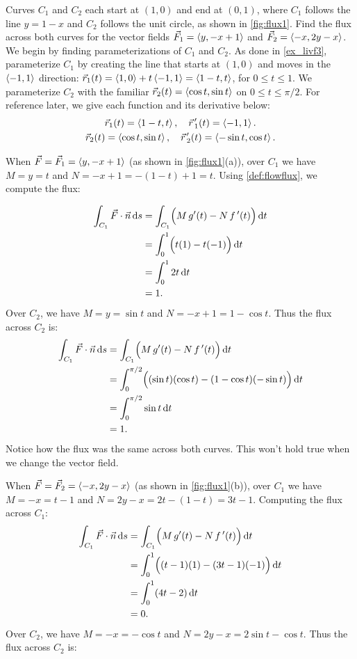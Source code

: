 \begin{example}\label{ex_flux1}%
Curves $C_1$ and $C_2$ each start at $(1,0)$ and end at $(0,1)$, where $C_1$ follows the line $y=1-x$ and $C_2$ follows the unit circle, as shown in \autoref{fig:flux1}. Find the flux across both curves for the vector fields $\vec F_1 =\left\langle y,-x+1\right\rangle$ and $\vec F_2 =\left\langle -x,2y-x\right\rangle$.
\solution
We begin by finding parameterizations of $C_1$ and $C_2$. As done in \autoref{ex_livf3}, parameterize $C_1$ by creating the line that starts at $(1,0)$ and moves in the $\left\langle -1,1\right\rangle$ direction: $\vec r_1(t) =\left\langle 1,0\right\rangle+t\left\langle -1,1\right\rangle=\left\langle 1-t,t\right\rangle$, for $0\leq t\leq 1$. We parameterize $C_2$ with the familiar $\vec r_2(t) =\left\langle \cos t,\sin t\right\rangle$ on $0\leq t\leq \pi/2$. For reference later, we give each function and its derivative below:
\begin{gather*}
\vec r_1(t) =\left\langle 1-t,t\right\rangle,\quad\vec r\hskip1.25pt '_1(t)=\left\langle -1,1\right\rangle.\\
\vec r_2(t) =\left\langle \cos t,\sin t\right\rangle, \quad \vec r\hskip1.25pt '_2(t) =\left\langle -\sin t,\cos t\right\rangle.
\end{gather*}

When $\vec F = \vec F_1 =\left\langle y,-x+1\right\rangle$ (as shown in \autoref{fig:flux1}(a)), over $C_1$ we have $M = y =t$ and $N = -x+1 = -(1-t)+1 = t$. Using \autoref{def:flowflux}, we compute the flux:

\begin{align*}
\int_{C_1} \vec F\cdot \vec n\operatorname{d}\! s & = \int_{C_1} \Bigl(M\,g'(t) - N\,f\,'(t)\Bigr)\operatorname{d}\! t\\
			&= \int_0^1 \Bigl( t(1) - t(-1)\Bigr)\operatorname{d}\! t \\
			&= \int_0^1 2t\operatorname{d}\! t\\
			&= 1.
\end{align*}
Over $C_2$, we have $M = y = \sin t$ and $N = -x+1 = 1-\cos t$. Thus the flux across $C_2$ is:
\begin{align*}
	\int_{C_1} \vec F\cdot \vec n\operatorname{d}\! s
	& = \int_{C_1} \Bigl(M\,g'(t) - N\,f\,'(t)\Bigr)\operatorname{d}\! t\\
	&= \int_0^{\pi/2}\Bigl((\sin t)(\cos t) - (1-\cos t)(-\sin t)\Bigr)\operatorname{d}\! t\\
	&= \int_0^{\pi/2} \sin t\operatorname{d}\! t\\
	&=1.
\end{align*}
Notice how the flux was the same across both curves. This won't hold true when we change the vector field.

When $\vec F=\vec F_2=\left\langle -x,2y-x\right\rangle$ (as shown in \autoref{fig:flux1}(b)), over $C_1$ we have $M=-x=t-1$ and $N=2y-x=2t-(1-t)=3t-1$. Computing the flux across $C_1$:
\begin{align*}
	\int_{C_1} \vec F\cdot \vec n\operatorname{d}\! s
	& = \int_{C_1} \Bigl(M\,g'(t) - N\,f\,'(t)\Bigr)\operatorname{d}\! t\\
	&= \int_0^1 \Bigl( (t-1)(1) - (3t-1)(-1)\Bigr)\operatorname{d}\! t \\
	&= \int_0^1 (4t-2)\operatorname{d}\! t\\
	&= 0.
\end{align*}
Over $C_2$, we have $M = -x = -\cos t$ and $N = 2y-x = 2\sin t-\cos t$. Thus the flux across $C_2$ is:


\end{example}
